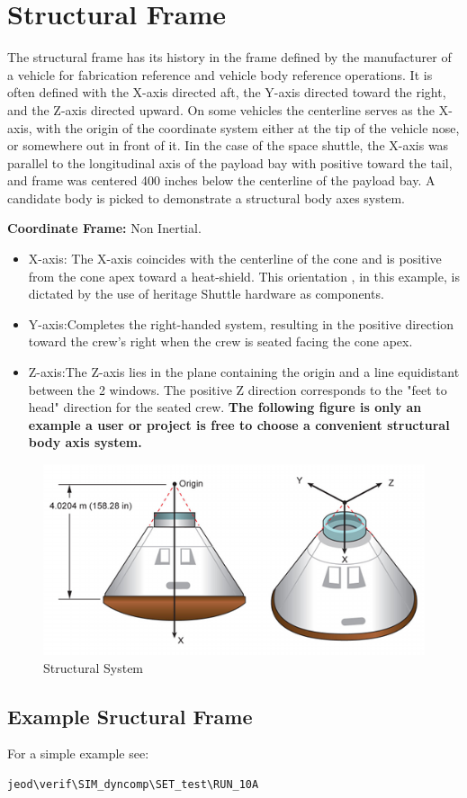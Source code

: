 
\section{Structural Frame } \label{sec:struc} 
The structural frame has its history in the frame defined by the
manufacturer of a vehicle for fabrication reference and vehicle body reference operations. It is often defined with the X-axis directed aft, the Y-axis directed toward the right, and the Z-axis directed upward. On some vehicles the centerline serves as the X-axis, with the origin of the coordinate system either at the tip of the vehicle nose, or somewhere out in front of it. Iin the case of the space shuttle, the X-axis was parallel to the longitudinal axis of the payload bay with positive toward the tail, and frame was centered 400 inches below the centerline of the payload bay. A candidate body is picked to demonstrate a structural body axes system.

\textbf{Coordinate Frame:} Non Inertial.

\begin{itemize}
\item X-axis: The X-axis coincides with the centerline of the cone and is positive from the cone apex toward a heat-shield. This orientation , in this example,  is dictated by the use of heritage Shuttle hardware as components.
\item Y-axis:Completes the right-handed system, resulting in the positive direction toward the crew's right when the crew is seated facing the cone apex.
\item Z-axis:The Z-axis lies in the plane containing the origin and a line equidistant between the 2 windows. The positive Z direction corresponds to the "feet to head" direction for the seated crew.
\textbf{The following figure is only an example a user or project is free to choose a convenient structural body axis system.}
\end{itemize}


\begin{figure}[htp]
\centering
\includegraphics [width=7in]{figs/fig11.png}
\caption{Structural System}
\label{fig:11}
\end{figure}

\subsection{Example Sructural Frame}
For a simple example see:
\begin{verbatim}
jeod\verif\SIM_dyncomp\SET_test\RUN_10A
\end{verbatim}



